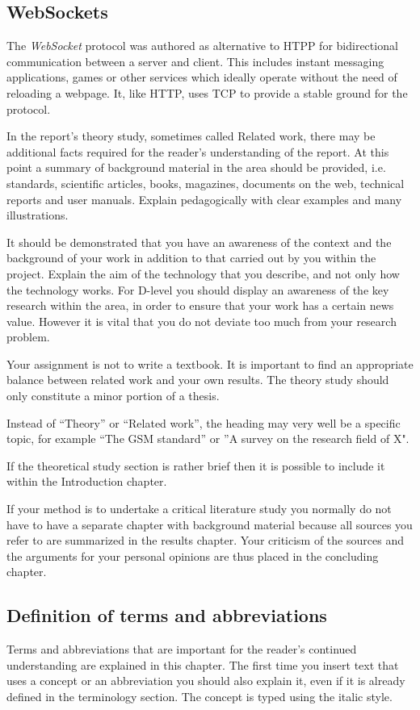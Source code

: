 \subsection{WebSockets}

The \textit{WebSocket} protocol was authored as alternative to HTPP for bidirectional communication between a server and client\cite{websocket}. This includes instant messaging applications, games or other services which ideally operate without the need of reloading a webpage. It, like HTTP, uses TCP to provide a stable ground for the protocol.

\iffalse
In the report's theory study, sometimes called Related work, there may be additional facts required for the reader's understanding of the report. At this point a summary of background material in the area should be provided, i.e. standards, scientific articles, books, magazines, documents on the web, technical reports and user manuals. Explain pedagogically with clear examples and many illustrations.

It should be demonstrated that you have an awareness of the context and the background of your work in addition to that carried out by you within the project. Explain the aim of the technology that you describe, and not only how the technology works. For D-level you should display an awareness of the key research within the area, in order to ensure that your work has a certain news value. However it is vital that you do not deviate too much from your research problem.

Your assignment is not to write a textbook. It is important to find an appropriate balance between related work and your own results. The theory study should only constitute a minor portion of a thesis.

Instead of “Theory” or “Related work”, the heading may very well be a specific topic, for example “The GSM standard” or ”A survey on the research field of X".

If the theoretical study section is rather brief then it is possible to include it within the Introduction chapter.

If your method is to undertake a critical literature study you normally do not have to have a separate chapter with background material because all sources you refer to are summarized in the results chapter. Your criticism of the sources and the arguments for your personal opinions are thus placed in the concluding chapter.

\subsection{Definition of terms and abbreviations}
\label{ch:theory:definitions}
Terms and abbreviations that are important for the reader's continued understanding are explained in this chapter. The first time you insert text that uses a concept or an abbreviation you should also explain it, even if it is already defined in the terminology section. The concept is typed using the italic style.

